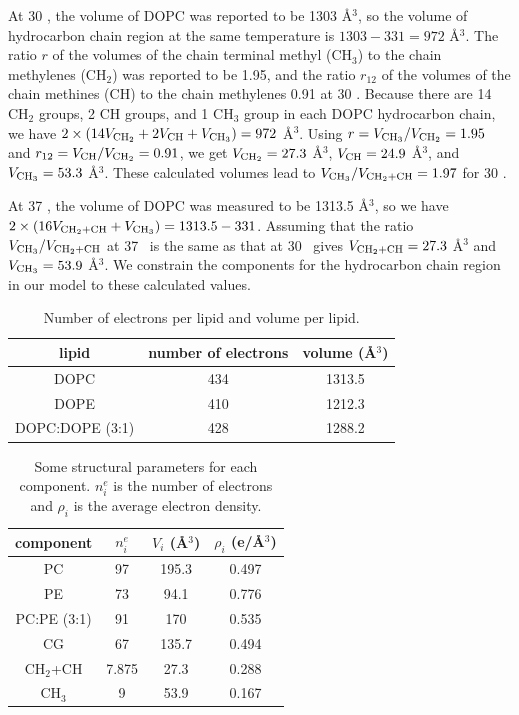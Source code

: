 At 30 \textcelsius, the volume of DOPC was reported to be 1303 \AA$^3$, 
so the volume of hydrocarbon chain region at the same temperature is 
$1303 - 331 = 972$ \AA$^3$. The ratio $r$ of the volumes
of the chain terminal methyl (CH$_3$) to the chain methylenes (CH$_2$) was 
reported to be 1.95, and the ratio $r_{12}$ of the volumes of the chain
methines (CH) to the chain methylenes 0.91 at 30 \textcelsius. 
Because there are 14 CH$_2$ groups,
2 CH groups, and 1 CH$_3$ group in each DOPC hydrocarbon chain, we have
$2\times(14V_{\textrm{CH}_2}+2V_\textrm{CH}+V_{\textrm{CH}_3})=972$ \AA$^3$. 
Using $r=V_{\textrm{CH}_3}/V_{\textrm{CH}_2}=1.95$ 
and $r_{12}=V_\textrm{CH}/V_{\textrm{CH}_2}=0.91$, we get $V_{\textrm{CH}_2}=27.3$ \AA$^3$, 
$V_\textrm{CH}=24.9$ \AA$^3$, and $V_{\textrm{CH}_3}=53.3$ \AA$^3$. 
These calculated volumes lead to $V_{\textrm{CH}_3}/V_{\textrm{CH}_2+\textrm{CH}}=1.97$  for 30 \textcelsius. 

At 37 \textcelsius, the volume of DOPC was measured to be 1313.5 \AA$^3$, so
we have $2\times(16V_{\textrm{CH}_2+\textrm{CH}}+V_{\textrm{CH}_3})=1313.5-331$. Assuming that the ratio 
$V_{\textrm{CH}_3}/V_{\textrm{CH}_2+\textrm{CH}}$ at 37 \textcelsius\ is the same as that at 30 \textcelsius\ 
gives $V_{\textrm{CH}_2+\textrm{CH}}=27.3$ \AA$^3$ and $V_{\textrm{CH}_3}=53.9$ \AA$^3$. We constrain
the components for the hydrocarbon chain region in our model 
to these calculated values.

\begin{table}[htbp]
  \centering
  \begin{tabular}{ccc}
    \hline
    lipid & number of electrons & volume (\AA$^3$) \\
    \hline
    DOPC & 434 & 1313.5 \\
    DOPE & 410 & 1212.3 \\
    DOPC:DOPE (3:1) & 428 & 1288.2 \\
    \hline
  \end{tabular}
  \caption{Number of electrons per lipid and volume per lipid.}
  \label{tb:electron_volume}
\end{table}

\begin{table}[htbp]
  \centering
  \begin{tabular}{cccc}
    \hline
    component & $n^e_i$ & $V_i$ (\AA$^3$) & $\rho_i$ (e/\AA$^3$) \\
    \hline 
    PC & 97 & 195.3 & 0.497 \\  
    PE & 73 & 94.1  & 0.776 \\
    PC:PE (3:1) & 91 & 170 & 0.535 \\
    CG & 67 & 135.7 & 0.494 \\  
    CH$_2$+CH & 7.875 & 27.3 & 0.288 \\
    CH$_3$ & 9 & 53.9 & 0.167 \\
    \hline
  \end{tabular}
  \caption{Some structural parameters for each component. 
  $n^e_i$ is the number of electrons and
  $\rho_i$ is the average electron density.
  }
  \label{tb:component}
\end{table}

